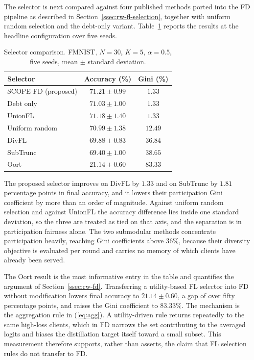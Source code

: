 \documentclass[journal]{IEEEtran}
\newcommand{\rev}[1]{#1}
\begin{document}
\rev{The selector is next compared against four published methods ported into the FD pipeline as described in Section~\ref{ssec:rw-fl-selection}, together with uniform random selection and the debt-only variant. Table~\ref{tab:baselines} reports the results at the headline configuration over five seeds.}

\begin{table}[t]
\centering
\caption{\rev{Selector comparison. FMNIST, $N=30$, $K=5$, $\alpha=0.5$, five seeds, mean $\pm$ standard deviation.}}
\label{tab:baselines}
\renewcommand{\arraystretch}{1.15}
\footnotesize
\setlength{\tabcolsep}{4pt}
\begin{tabular}{@{}lcc@{}}
\toprule
\textbf{Selector} & \textbf{Accuracy (\%)} & \textbf{Gini (\%)} \\
\midrule
SCOPE-FD (proposed) & $71.21 \pm 0.99$ & $1.33$ \\
Debt only           & $71.03 \pm 1.00$ & $1.33$ \\
UnionFL \cite{castillo2025subtrunc}  & $71.18 \pm 1.40$ & $1.33$ \\
Uniform random      & $70.99 \pm 1.38$ & $12.49$ \\
DivFL \cite{balakrishnan2022divfl}   & $69.88 \pm 0.83$ & $36.84$ \\
SubTrunc \cite{castillo2024subtrunc} & $69.40 \pm 1.00$ & $38.65$ \\
Oort \cite{lai2021oort}              & $21.14 \pm 0.60$ & $83.33$ \\
\bottomrule
\end{tabular}
\end{table}

\rev{The proposed selector improves on DivFL by $1.33$ and on SubTrunc by $1.81$ percentage points in final accuracy, and it lowers their participation Gini coefficient by more than an order of magnitude. Against uniform random selection and against UnionFL the accuracy difference lies inside one standard deviation, so the three are treated as tied on that axis, and the separation is in participation fairness alone. The two submodular methods concentrate participation heavily, reaching Gini coefficients above $36\%$, because their diversity objective is evaluated per round and carries no memory of which clients have already been served.}

\rev{The Oort result is the most informative entry in the table and quantifies the argument of Section~\ref{ssec:rw-fd}. Transferring a utility-based FL selector into FD without modification lowers final accuracy to $21.14 \pm 0.60$, a gap of over fifty percentage points, and raises the Gini coefficient to $83.33\%$. The mechanism is the aggregation rule in (\ref{eq:agg}). A utility-driven rule returns repeatedly to the same high-loss clients, which in FD narrows the set contributing to the averaged logits and biases the distillation target itself toward a small subset. This measurement therefore supports, rather than asserts, the claim that FL selection rules do not transfer to FD.}
\end{document}
